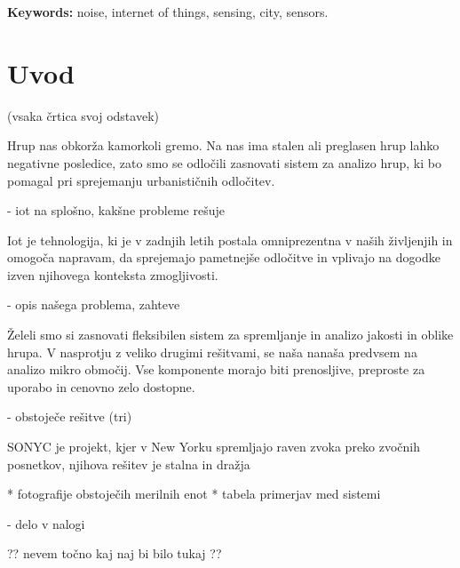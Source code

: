 \documentclass[a4paper, 12pt]{book}
\newcommand{\tkeywordsEn}{noise, internet of things, sensing, city, sensors}
\newcommand{\clearemptydoublepage}{\newpage{\pagestyle{empty}\cleardoublepage}}
\begin{document}
\noindent\textbf{Keywords:} \tkeywordsEn.
\clearemptydoublepage

\mainmatter
\setcounter{page}{1}
\pagestyle{fancy}



\chapter{Uvod}
(vsaka črtica svoj odstavek)

Hrup nas obkorža kamorkoli gremo. Na nas ima stalen ali preglasen hrup lahko negativne posledice, zato smo se odločili zasnovati sistem za analizo hrup, ki bo pomagal pri sprejemanju urbanističnih odločitev.

- iot na splošno, kakšne probleme rešuje
 
Iot je tehnologija, ki je v zadnjih letih postala omniprezentna v naših življenjih in omogoča napravam, da sprejemajo pametnejše odločitve in vplivajo na dogodke izven njihovega konteksta zmogljivosti.

- opis našega problema, zahteve

Želeli smo si zasnovati fleksibilen sistem za spremljanje in analizo jakosti in oblike hrupa. V nasprotju z veliko drugimi rešitvami, se naša nanaša predvsem na analizo mikro območij. Vse komponente morajo biti prenosljive, preproste za uporabo in cenovno zelo dostopne.

- obstoječe rešitve (tri)

SONYC je projekt, kjer v New Yorku spremljajo raven zvoka preko zvočnih posnetkov, njihova rešitev je stalna in dražja

* fotografije obstoječih merilnih enot
* tabela primerjav med sistemi

- delo v nalogi

?? nevem točno kaj naj bi bilo tukaj ??
\end{document}
